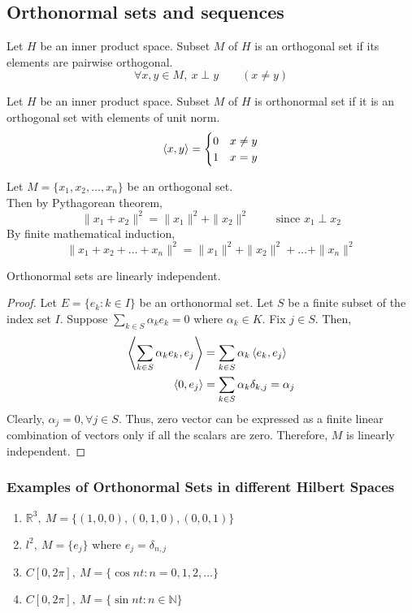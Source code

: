 \subsection{Orthonormal sets and sequences}
\begin{definition}[orthogonal]
	Let $H$ be an inner product space.
	Subset $M$ of $H$ is an orthogonal set if its elements are pairwise orthogonal.
	\[ \forall x,y \in M,\ x \perp y \qquad (x \ne y) \]
\end{definition}
\begin{definition}[orthonormal]
	Let $H$ be an inner product space.
	Subset $M$ of $H$ is orthonormal set if it is an orthogonal set with elements of unit norm.
	\[ \left\langle x,y \right\rangle = \begin{cases} 0 & x \ne y \\ 1 & x = y \end{cases} \]
\end{definition}

\begin{remark}
	Let $M = \{ x_1,x_2,\dots,x_n\}$ be an orthogonal set.\\
	Then by Pythagorean theorem,
	\[ \|x_1 + x_2\|^2 = \|x_1\|^2 + \|x_2\|^2 \qquad \text{ since } x_1 \perp x_2 \]
	By finite mathematical induction,
	\[ \|x_1 + x_2 + \dots + x_n\|^2 = \|x_1\|^2 + \|x_2\|^2 + \dots + \|x_n\|^2 \]
\end{remark}

\begin{lemma}
	Orthonormal sets are linearly independent.
\end{lemma}
\begin{proof}
	Let $E = \{e_k : k \in I\}$ be an orthonormal set.
	Let $S$ be a finite subset of the index set $I$.
	Suppose $\displaystyle \sum_{k \in S} \alpha_k e_k = 0$ where $\alpha_k \in K$.
	Fix $j \in S$.
	Then,
	\begin{align*}
		\left\langle \sum_{k \in S} \alpha_k e_k,e_j \right\rangle 
		& = \sum_{k \in S} \alpha_k \left\langle e_k,e_j \right\rangle \\
		\left\langle 0,e_j \right\rangle & = \sum_{k \in S} \alpha_k \delta_{k,j} = \alpha_j
	\end{align*}
	Clearly, $\alpha_j = 0, \forall j \in S$.
	Thus, zero vector can be expressed as a finite linear combination of vectors only if all the scalars are zero.
	Therefore, $M$ is linearly independent.
\end{proof}

\subsubsection{Examples of Orthonormal Sets in different Hilbert Spaces}
\begin{enumerate}
	\item $\mathbb{R}^3,\ M = \{(1,0,0),(0,1,0),(0,0,1)\}$
	\item $l^2,\ M = \{e_j\}$ where $e_j =\delta_{n,j}$
	\item $C[0,2\pi],\ M = \{ \cos nt : n =0,1,2,\dots \}$
	\item $C[0,2\pi],\ M = \{ \sin nt : n \in \mathbb{N} \}$
\end{enumerate}

